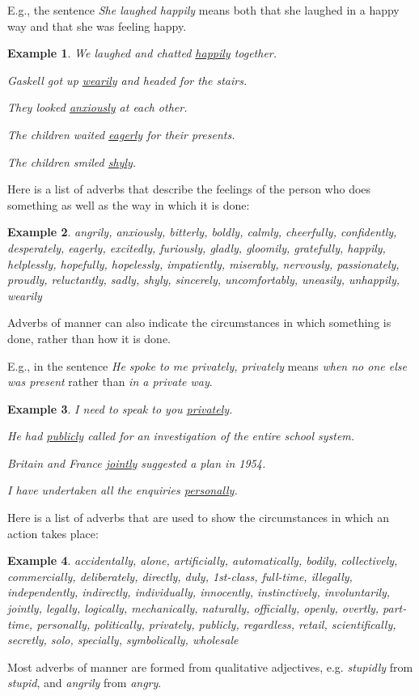 \documentclass[oneside]{book}
\numberwithin{equation}{section}
\newtheorem{example}{Example}[section]
\begin{document}
%
E.g., the sentence \textit{She laughed happily} means both that she laughed in a happy way and that she was feeling happy.
\begin{example}
    We laughed and chatted \underline{happily} together.
    
    Gaskell got up \underline{wearily} and headed for the stairs.
    
    They looked \underline{anxiously} at each other.
    
    The children waited \underline{eagerly} for their presents.
    
    The children smiled \underline{shyly}.
\end{example}
%
\noindent{} Here is a list of adverbs that describe the feelings of the person who does something as well as the way in which it is done:
\begin{example}
    angrily, anxiously, bitterly, boldly, calmly, cheerfully, confidently, desperately, eagerly, excitedly, furiously, gladly, gloomily, gratefully, happily, helplessly, hopefully, hopelessly, impatiently, miserably, nervously, passionately, proudly, reluctantly, sadly, shyly, sincerely, uncomfortably, uneasily, unhappily, wearily
\end{example}
%
\noindent{} Adverbs of manner can also indicate the circumstances in which something is done, rather than how it is done.

E.g., in the sentence \textit{He spoke to me privately, privately} means \textit{when no one else was present} rather than \textit{in a private way}.
\begin{example}
    I need to speak to you \underline{privately}.
    
    He had \underline{publicly} called for an investigation of the entire school system.
    
    Britain and France \underline{jointly} suggested a plan in 1954.
    
    I have undertaken all the enquiries \underline{personally}.
\end{example}
%
\noindent{} Here is a list of adverbs that are used to show the circumstances in which an action takes place:
\begin{example}
    accidentally, alone, artificially, automatically, bodily, collectively, commercially, deliberately, directly, duly, 1st-class, full-time, illegally, independently, indirectly, individually, innocently, instinctively, involuntarily, jointly, legally, logically, mechanically, naturally, officially, openly, overtly, part-time, personally, politically, privately, publicly, regardless, retail, scientifically, secretly, solo, specially, symbolically, wholesale
\end{example}
%
\noindent{} Most adverbs of manner are formed from qualitative adjectives, e.g. \textit{stupidly} from \textit{stupid}, and \textit{angrily} from \textit{angry}.
\end{document}

